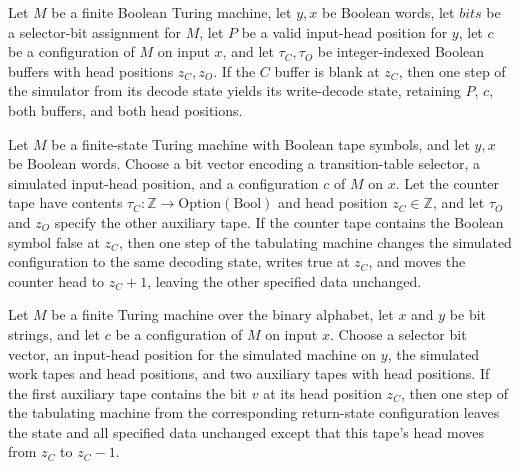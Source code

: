 \begin{theorem}
\label{Complexity.Meyer.dec_under}
\leanok
{}
Let $M$ be a finite Boolean Turing machine, let $y,x$ be Boolean words, let $bits$ be a
selector-bit assignment for $M$, let $P$ be a valid input-head position for $y$, let $c$
be a configuration of $M$ on input $x$, and let $\tau_C,\tau_O$ be integer-indexed
Boolean buffers with head positions $z_C,z_O$. If the $C$ buffer is blank at $z_C$, then
one step of the simulator from its decode state yields its write-decode state, retaining
$P$, $c$, both buffers, and both head positions.
\end{theorem}

\begin{theorem}
\label{Complexity.Meyer.dec_zero}
\leanok
{}
Let $M$ be a finite-state Turing machine with Boolean tape symbols, and let $y,x$ be
Boolean words. Choose a bit vector encoding a transition-table selector, a simulated
input-head position, and a configuration $c$ of $M$ on $x$. Let the counter tape have
contents $\tau_C:\mathbb{Z}\to\mathrm{Option}(\mathrm{Bool})$ and head position
$z_C\in\mathbb{Z}$, and let $\tau_O$ and $z_O$ specify the other auxiliary tape. If the
counter tape contains the Boolean symbol false at $z_C$, then one step of the tabulating
machine changes the simulated configuration to the same decoding state, writes true at
$z_C$, and moves the counter head to $z_C+1$, leaving the other specified data
unchanged.
\end{theorem}

\begin{theorem}
\label{Complexity.Meyer.ret_some}
\leanok
{}
Let $M$ be a finite Turing machine over the binary alphabet, let $x$ and $y$ be bit
strings, and let $c$ be a configuration of $M$ on input $x$. Choose a selector bit
vector, an input-head position for the simulated machine on $y$, the simulated work
tapes and head positions, and two auxiliary tapes with head positions. If the first
auxiliary tape contains the bit $v$ at its head position $z_C$, then one step of the
tabulating machine from the corresponding return-state configuration leaves the state
and all specified data unchanged except that this tape's head moves from $z_C$ to
$z_C-1$.
\end{theorem}

